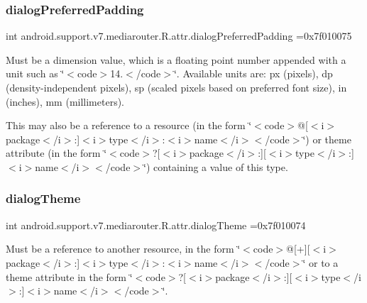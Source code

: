 \subsubsection{\texorpdfstring{dialog\+Preferred\+Padding}{dialogPreferredPadding}}
{\footnotesize\ttfamily int android.\+support.\+v7.\+mediarouter.\+R.\+attr.\+dialog\+Preferred\+Padding =0x7f010075\hspace{0.3cm}{\ttfamily [static]}}

Must be a dimension value, which is a floating point number appended with a unit such as \char`\"{}$<$code$>$14.\+5sp$<$/code$>$\char`\"{}. Available units are\+: px (pixels), dp (density-\/independent pixels), sp (scaled pixels based on preferred font size), in (inches), mm (millimeters). 

This may also be a reference to a resource (in the form \char`\"{}$<$code$>$@\mbox{[}$<$i$>$package$<$/i$>$\+:\mbox{]}$<$i$>$type$<$/i$>$\+:$<$i$>$name$<$/i$>$$<$/code$>$\char`\"{}) or theme attribute (in the form \char`\"{}$<$code$>$?\mbox{[}$<$i$>$package$<$/i$>$\+:\mbox{]}\mbox{[}$<$i$>$type$<$/i$>$\+:\mbox{]}$<$i$>$name$<$/i$>$$<$/code$>$\char`\"{}) containing a value of this type. \mbox{\label{classandroid_1_1support_1_1v7_1_1mediarouter_1_1R_1_1attr_a2f9840e6a4c028c1cad08bae7f0ee960}} 
\subsubsection{\texorpdfstring{dialog\+Theme}{dialogTheme}}
{\footnotesize\ttfamily int android.\+support.\+v7.\+mediarouter.\+R.\+attr.\+dialog\+Theme =0x7f010074\hspace{0.3cm}{\ttfamily [static]}}

Must be a reference to another resource, in the form \char`\"{}$<$code$>$@\mbox{[}+\mbox{]}\mbox{[}$<$i$>$package$<$/i$>$\+:\mbox{]}$<$i$>$type$<$/i$>$\+:$<$i$>$name$<$/i$>$$<$/code$>$\char`\"{} or to a theme attribute in the form \char`\"{}$<$code$>$?\mbox{[}$<$i$>$package$<$/i$>$\+:\mbox{]}\mbox{[}$<$i$>$type$<$/i$>$\+:\mbox{]}$<$i$>$name$<$/i$>$$<$/code$>$\char`\"{}. \mbox{\label{classandroid_1_1support_1_1v7_1_1mediarouter_1_1R_1_1attr_aa8901ce272bac5ae82af0d8a34f9ae05}} 
